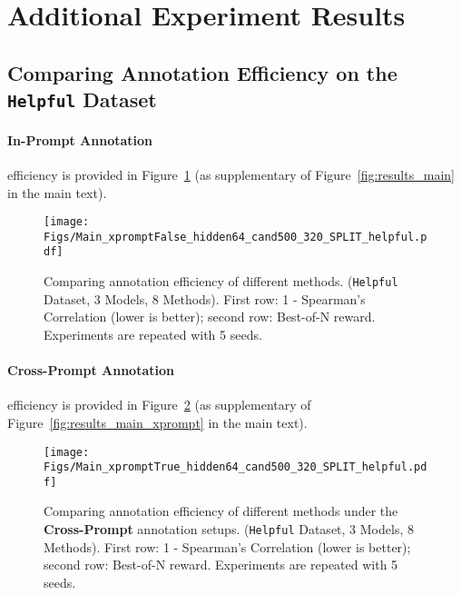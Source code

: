 \clearpage
\section{Additional Experiment Results}
%


\subsection{Comparing Annotation Efficiency on the \texttt{Helpful} Dataset}
\label{appdx:more_results_results_main}

\paragraph{In-Prompt Annotation} efficiency is provided in Figure~\ref{fig:results_main_helpful} (as supplementary of Figure~\ref{fig:results_main} in the main text).

\begin{figure}[h!]
    \centering
    \texttt{[image: Figs/Main\_xpromptFalse\_hidden64\_cand500\_320\_SPLIT\_helpful.pdf]}
    \caption{Comparing annotation efficiency of different methods. (\texttt{Helpful} Dataset, 3 Models, 8 Methods). First row: 1 - Spearman's Correlation (lower is better); second row: Best-of-N reward. Experiments are repeated with 5 seeds.}
    \label{fig:results_main_helpful}
\end{figure}

\paragraph{Cross-Prompt Annotation} efficiency is provided in Figure~\ref{fig:results_main_xprompt_helpful} (as supplementary of Figure~\ref{fig:results_main_xprompt} in the main text).

\begin{figure}[h!]
    \centering
    \texttt{[image: Figs/Main\_xpromptTrue\_hidden64\_cand500\_320\_SPLIT\_helpful.pdf]}
    \caption{\small Comparing annotation efficiency of different methods under the \textbf{Cross-Prompt} annotation setups. (\texttt{Helpful} Dataset, 3 Models, 8 Methods). First row: 1 - Spearman's Correlation (lower is better); second row: Best-of-N reward. Experiments are repeated with 5 seeds.}
    \label{fig:results_main_xprompt_helpful}
\end{figure}





